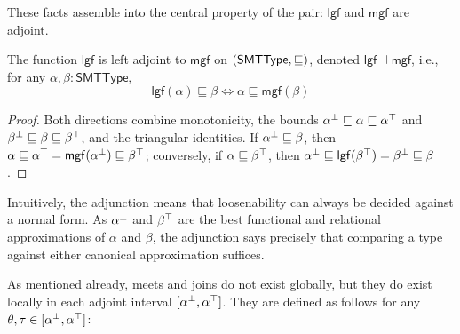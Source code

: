 These facts assemble into the central property of the pair: $\mathsf{lgf}$ and $\mathsf{mgf}$ are adjoint.
\begin{theorem}
  The function $\mathsf{lgf}$ is left adjoint to $\mathsf{mgf}$ on $(\mathsf{SMTType},  \sqsubseteq )$, denoted $\mathsf{lgf} \dashv \mathsf{mgf}$, i.e., for any $\alpha, \beta : \mathsf{SMTType}$,
  \[
    \mathsf{lgf}(\alpha) \sqsubseteq \beta \iff \alpha \sqsubseteq \mathsf{mgf}(\beta)
  \]
  \begin{center}
  \end{center}
\end{theorem}
\begin{proof}
Both directions combine monotonicity, the bounds ${\alpha}^{\bot} \sqsubseteq \alpha \sqsubseteq {\alpha}^{\top}$ and ${\beta}^{\bot} \sqsubseteq \beta \sqsubseteq {\beta}^{\top}$, and the triangular identities. If ${\alpha}^{\bot} \sqsubseteq \beta$, then $\alpha \sqsubseteq {\alpha}^{\top} = \mathsf{mgf}({\alpha}^{\bot}) \sqsubseteq {\beta}^{\top}$; conversely, if $\alpha \sqsubseteq {\beta}^{\top}$, then ${\alpha}^{\bot} \sqsubseteq \mathsf{lgf}({\beta}^{\top}) = {\beta}^{\bot} \sqsubseteq \beta$.
\end{proof}

Intuitively, the adjunction means that loosenability can always be decided against a normal form. As ${\alpha}^{\bot}$ and ${\beta}^{\top}$ are the best functional and relational approximations of $\alpha$ and $\beta$, the adjunction says precisely that comparing a type against either canonical approximation suffices.

As mentioned already, meets and joins do not exist globally, but they do exist locally in each adjoint interval $[{\alpha}^{\bot}, {\alpha}^{\top}]$.
They are defined as follows for any $\theta, \tau \in [{\alpha}^{\bot}, {\alpha}^{\top}]$:

